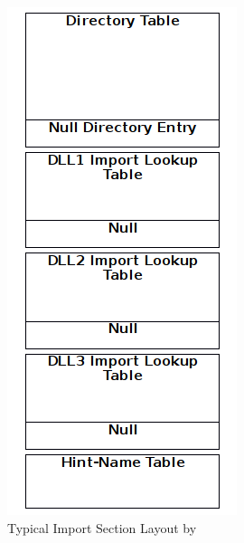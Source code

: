 \begin{figure}
\includegraphics[width=.98\textwidth, height=.60\textheight,keepaspectratio]{graphics/importsection}
\caption{Typical Import Section Layout by }
\label{fig:import} 
\end{figure}

